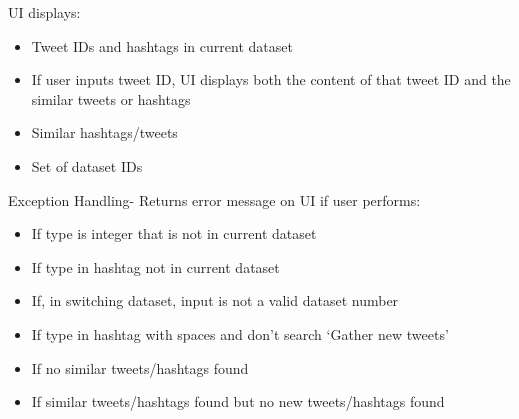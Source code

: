 \documentclass[10pt]{article}
\begin{document}
\begin{itemize}
UI displays:
\begin{itemize} 
\item Tweet IDs and hashtags in current dataset
\item If user inputs tweet ID, UI displays both the content of that tweet ID and the similar tweets or hashtags
\item Similar hashtags/tweets
\item Set of dataset IDs
\end{itemize}

Exception Handling- Returns error message on UI if user performs:
\begin{itemize} 
\item If type is integer that is not in current dataset
\item If type in hashtag not in current dataset
\item If, in switching dataset, input is not a valid dataset number
\item If type in hashtag with spaces and don’t search ‘Gather new tweets’
\item If no similar tweets/hashtags found
\item If similar tweets/hashtags found but no new tweets/hashtags found
\end{itemize}

\end{itemize}
\end{document}
